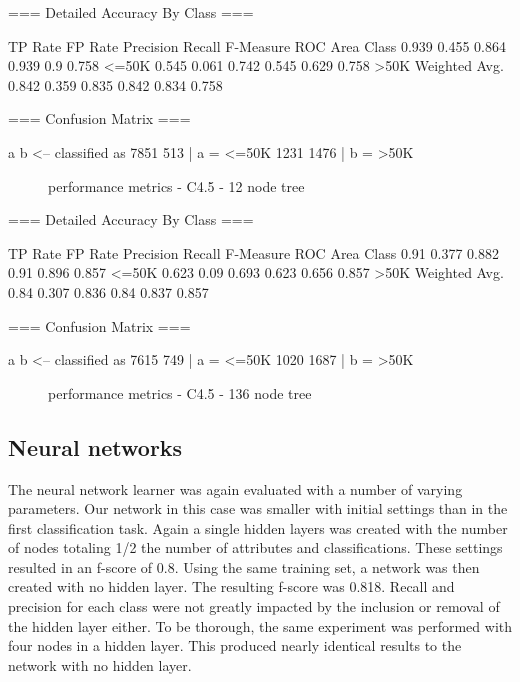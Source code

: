 \documentclass{sig-alternate}
\begin{document}
\tiny
\begin{verbbox}
=== Detailed Accuracy By Class ===

               TP Rate   FP Rate   Precision   Recall  F-Measure   ROC Area  Class
                 0.939     0.455      0.864     0.939     0.9        0.758     <=50K
                 0.545     0.061      0.742     0.545     0.629      0.758     >50K
Weighted Avg.    0.842     0.359      0.835     0.842     0.834      0.758

=== Confusion Matrix ===

    a    b   <-- classified as
 7851  513 |    a =  <=50K
 1231 1476 |    b =  >50K
\end{verbbox}
\normalsize

\begin{figure}[!htbp]
    \centering
    \theverbbox
    \caption{performance metrics - C4.5 - 12 node tree\label{ad-dt-sm}}
\end{figure}

\tiny
\begin{verbbox}
=== Detailed Accuracy By Class ===

               TP Rate   FP Rate   Precision   Recall  F-Measure   ROC Area  Class
                 0.91      0.377      0.882     0.91      0.896      0.857     <=50K
                 0.623     0.09       0.693     0.623     0.656      0.857     >50K
Weighted Avg.    0.84      0.307      0.836     0.84      0.837      0.857

=== Confusion Matrix ===

    a    b   <-- classified as
 7615  749 |    a =  <=50K
 1020 1687 |    b =  >50K

\end{verbbox}
\normalsize

\begin{figure}[!htbp]
    \centering
    \theverbbox
    \caption{performance metrics - C4.5 - 136 node tree\label{ad-dt-lg}}
\end{figure}



\subsection{Neural networks}

The neural network learner was again evaluated with a number of varying parameters. Our network in this case was smaller with initial settings than in the first classification task. Again a single hidden layers was created with the number of nodes totaling 1/2 the number of attributes and classifications. These settings resulted in an f-score of 0.8. Using the same training set, a network was then created with no hidden layer. The resulting f-score was 0.818. Recall and precision for each class were not greatly impacted by the inclusion or removal of the hidden layer either. To be thorough, the same experiment was performed with four nodes in a hidden layer. This produced nearly identical results to the network with no hidden layer.
\end{document}
